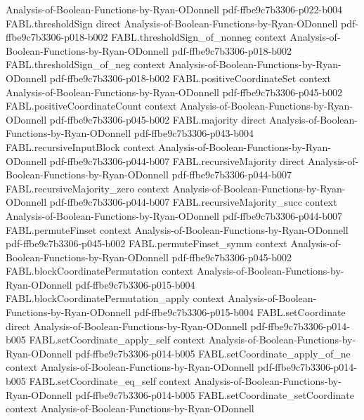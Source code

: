 \begin{theorem}
  {Analysis-of-Boolean-Functions-by-Ryan-ODonnell}
  {pdf-ffbe9c7b3306-p022-b004}
\proofstep
  {FABL.thresholdSign}
  {direct}
  {Analysis-of-Boolean-Functions-by-Ryan-ODonnell}
  {pdf-ffbe9c7b3306-p018-b002}
\proofstep
  {FABL.thresholdSign_of_nonneg}
  {context}
  {Analysis-of-Boolean-Functions-by-Ryan-ODonnell}
  {pdf-ffbe9c7b3306-p018-b002}
\proofstep
  {FABL.thresholdSign_of_neg}
  {context}
  {Analysis-of-Boolean-Functions-by-Ryan-ODonnell}
  {pdf-ffbe9c7b3306-p018-b002}
\proofstep
  {FABL.positiveCoordinateSet}
  {context}
  {Analysis-of-Boolean-Functions-by-Ryan-ODonnell}
  {pdf-ffbe9c7b3306-p045-b002}
\proofstep
  {FABL.positiveCoordinateCount}
  {context}
  {Analysis-of-Boolean-Functions-by-Ryan-ODonnell}
  {pdf-ffbe9c7b3306-p045-b002}
\proofstep
  {FABL.majority}
  {direct}
  {Analysis-of-Boolean-Functions-by-Ryan-ODonnell}
  {pdf-ffbe9c7b3306-p043-b004}
\proofstep
  {FABL.recursiveInputBlock}
  {context}
  {Analysis-of-Boolean-Functions-by-Ryan-ODonnell}
  {pdf-ffbe9c7b3306-p044-b007}
\proofstep
  {FABL.recursiveMajority}
  {direct}
  {Analysis-of-Boolean-Functions-by-Ryan-ODonnell}
  {pdf-ffbe9c7b3306-p044-b007}
\proofstep
  {FABL.recursiveMajority_zero}
  {context}
  {Analysis-of-Boolean-Functions-by-Ryan-ODonnell}
  {pdf-ffbe9c7b3306-p044-b007}
\proofstep
  {FABL.recursiveMajority_succ}
  {context}
  {Analysis-of-Boolean-Functions-by-Ryan-ODonnell}
  {pdf-ffbe9c7b3306-p044-b007}
\proofstep
  {FABL.permuteFinset}
  {context}
  {Analysis-of-Boolean-Functions-by-Ryan-ODonnell}
  {pdf-ffbe9c7b3306-p045-b002}
\proofstep
  {FABL.permuteFinset_symm}
  {context}
  {Analysis-of-Boolean-Functions-by-Ryan-ODonnell}
  {pdf-ffbe9c7b3306-p045-b002}
\proofstep
  {FABL.blockCoordinatePermutation}
  {context}
  {Analysis-of-Boolean-Functions-by-Ryan-ODonnell}
  {pdf-ffbe9c7b3306-p015-b004}
\proofstep
  {FABL.blockCoordinatePermutation_apply}
  {context}
  {Analysis-of-Boolean-Functions-by-Ryan-ODonnell}
  {pdf-ffbe9c7b3306-p015-b004}
\proofstep
  {FABL.setCoordinate}
  {direct}
  {Analysis-of-Boolean-Functions-by-Ryan-ODonnell}
  {pdf-ffbe9c7b3306-p014-b005}
\proofstep
  {FABL.setCoordinate_apply_self}
  {context}
  {Analysis-of-Boolean-Functions-by-Ryan-ODonnell}
  {pdf-ffbe9c7b3306-p014-b005}
\proofstep
  {FABL.setCoordinate_apply_of_ne}
  {context}
  {Analysis-of-Boolean-Functions-by-Ryan-ODonnell}
  {pdf-ffbe9c7b3306-p014-b005}
\proofstep
  {FABL.setCoordinate_eq_self}
  {context}
  {Analysis-of-Boolean-Functions-by-Ryan-ODonnell}
  {pdf-ffbe9c7b3306-p014-b005}
\proofstep
  {FABL.setCoordinate_setCoordinate}
  {context}
  {Analysis-of-Boolean-Functions-by-Ryan-ODonnell}

\end{theorem}
